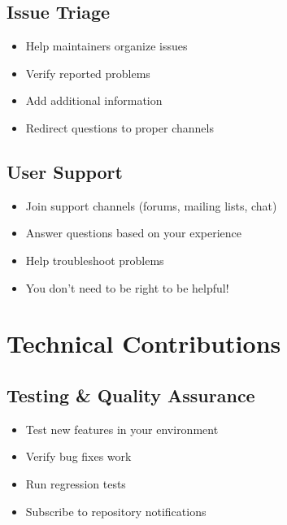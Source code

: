 \documentclass{presentacion}
\begin{document}
\subsection{Issue Triage}
\begin{frame}
    \begin{itemize}[<+->]
        \item Help maintainers organize issues
        \item Verify reported problems
        \item Add additional information
        \item Redirect questions to proper channels
    \end{itemize}
    
    \vspace{1em}
\end{frame}

\subsection{User Support}
\begin{frame}
    \begin{itemize}[<+->]
        \item Join support channels (forums, mailing lists, chat)
        \item Answer questions based on your experience
        \item Help troubleshoot problems
        \item You don't need to be right to be helpful!
    \end{itemize}
    
    \vspace{1em}
\end{frame}

\section{Technical Contributions}

\subsection{Testing \& Quality Assurance}
\begin{frame}
    \begin{itemize}[<+->]
        \item Test new features in your environment
        \item Verify bug fixes work
        \item Run regression tests
        \item Subscribe to repository notifications
    \end{itemize}
    
    \vspace{1em}
\end{frame}
\end{document}
